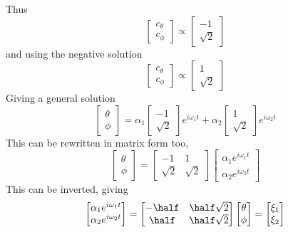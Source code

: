 Thus 
\begin{equation}
  \label{eq:44}
    \begin{bmatrix}
    c_{\theta} \\ c_{\phi} 
  \end{bmatrix} \propto
  \begin{bmatrix}
    -1 \\ \sqrt{2}
  \end{bmatrix}
\end{equation}
and using the negative solution
\begin{equation}
  \label{eq:45}
    \begin{bmatrix}
    c_{\theta} \\ c_{\phi} 
  \end{bmatrix} \propto
  \begin{bmatrix}
    1 \\ \sqrt{2}
  \end{bmatrix}
\end{equation}
Giving a general solution
\begin{equation}
  \label{eq:45}
  \begin{bmatrix} \theta \\ \phi \end{bmatrix}
= \alpha_1 \begin{bmatrix}  -1 \\ \sqrt{2}  \end{bmatrix} e^{i \omega_1 t} + \alpha_2 \begin{bmatrix}  1 \\ \sqrt{2}  \end{bmatrix} e^{i \omega_2 t}
\end{equation}
This can be rewritten in matrix form too,
\begin{equation}
  \label{eq:46}
    \begin{bmatrix} \theta \\ \phi \end{bmatrix} = 
    \begin{bmatrix} - 1 & 1 \\ \sqrt{2} & \sqrt{2} \end{bmatrix}
    \begin{bmatrix} \alpha_1 e^{i \omega_1 t} \\ \alpha_2 e^{i \omega_2 t}    \end{bmatrix}
\end{equation}
This can be inverted, giving
\begin{equation}
  \label{eq:47}
    \begin{bmatrix} \alpha_1 e^{i \omega_1 t} \\ \alpha_2 e^{i \omega_2 t}    \end{bmatrix} =
    \begin{bmatrix} - \half & \half \sqrt{2} \\ \half & \half \sqrt{2} \end{bmatrix}
    \begin{bmatrix} \theta \\ \phi \end{bmatrix} =
    \begin{bmatrix} \xi_1 \\ \xi_2 \end{bmatrix}
\end{equation}
